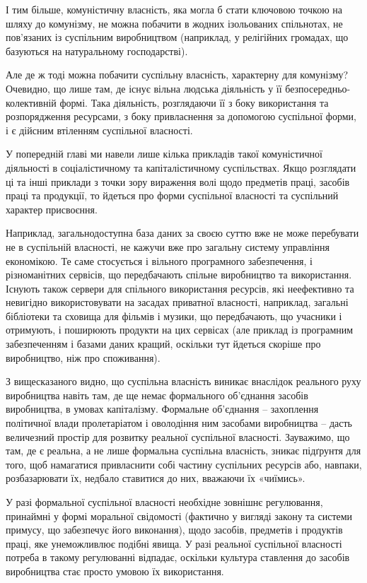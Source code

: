 \documentclass[12pt,a4paper,openany]{book}
\begin{document}
І тим більше, комуністичну власність, яка могла б стати ключовою точкою на шляху до комунізму, не можна побачити в жодних ізольованих спільнотах, не пов’язаних із суспільним виробництвом (наприклад, у релігійних громадах, що базуються на натуральному господарстві).

Але де ж тоді можна побачити суспільну власність, характерну для комунізму? Очевидно, що лише там, де існує вільна людська діяльність у її безпосередньо-колективній формі. Така діяльність, розглядаючи її з боку використання та розпорядження ресурсами, з боку привласнення за допомогою суспільної форми, і є дійсним втіленням суспільної власності.

У попередній главі ми навели лише кілька прикладів такої комуністичної діяльності в соціалістичному та капіталістичному суспільствах. Якщо розглядати ці та інші приклади з точки зору вираження волі щодо предметів праці, засобів праці та продукції, то йдеться про форми суспільної власності та суспільний характер присвоєння.

Наприклад, загальнодоступна база даних за своєю суттю вже не може перебувати не в суспільній власності, не кажучи вже про загальну систему управління економікою. Те саме стосується і вільного програмного забезпечення, і різноманітних сервісів, що передбачають спільне виробництво та використання. Існують також сервери для спільного використання ресурсів, які неефективно та невигідно використовувати на засадах приватної власності, наприклад, загальні бібліотеки та сховища для фільмів і музики, що передбачають, що учасники і отримують, і поширюють продукти на цих сервісах (але приклад із програмним забезпеченням і базами даних кращий, оскільки тут йдеться скоріше про виробництво, ніж про споживання).

З вищесказаного видно, що суспільна власність виникає внаслідок реального руху виробництва навіть там, де ще немає формального об’єднання засобів виробництва, в умовах капіталізму. Формальне об’єднання – захоплення політичної влади пролетаріатом і оволодіння ним засобами виробництва – дасть величезний простір для розвитку реальної суспільної власності. Зауважимо, що там, де є реальна, а не лише формальна суспільна власність, зникає підґрунтя для того, щоб намагатися привласнити собі частину суспільних ресурсів або, навпаки, розбазарювати їх, недбало ставитися до них, вважаючи їх «чиїмись».

У разі формальної суспільної власності необхідне зовнішнє регулювання, принаймні у формі моральної свідомості (фактично у вигляді закону та системи примусу, що забезпечує його виконання), щодо засобів, предметів і продуктів праці, яке унеможливлює подібні явища. У разі реальної суспільної власності потреба в такому регулюванні відпадає, оскільки культура ставлення до засобів виробництва стає просто умовою їх використання.
\ifSubfilesClassLoaded{\setcounter{page}{36}}{}
\end{document}
